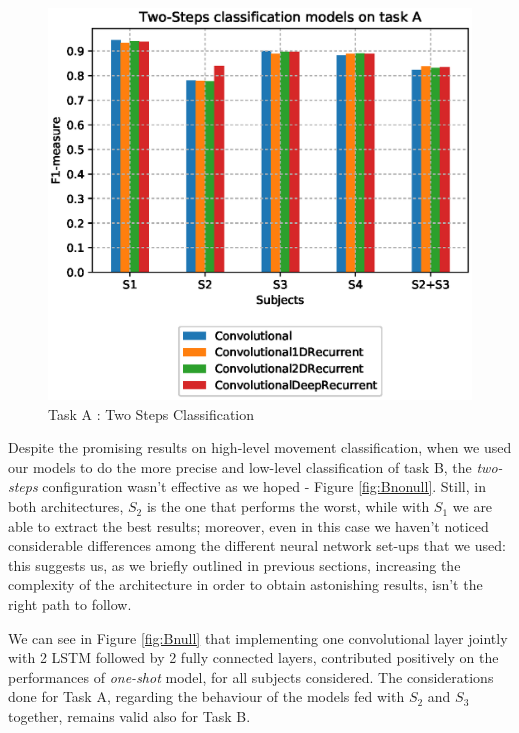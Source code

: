 \begin{figure}[ht]
	\centering
	\includegraphics[scale=.4]{figure/A_models_nonullclass}
	\caption{Task A : Two Steps Classification}
	\label{fig:Anonull}
\end{figure}

Despite the promising results on high-level movement classification, when we used our models to do the more precise and low-level classification of task B, the \textit{two-steps} configuration wasn't effective as we hoped - Figure \ref{fig:Bnonull}. Still, in both architectures, $S_2$ is the one that performs the worst, while with $S_1$ we are able to extract the best results; moreover, even in this case we haven't noticed considerable differences among the different neural network set-ups that we used: this suggests us, as we briefly outlined in previous sections, increasing the complexity of the architecture in order to obtain astonishing results, isn't the right path to follow. 

We can see in Figure \ref{fig:Bnull} that implementing one convolutional layer jointly with 2 LSTM followed by 2 fully connected layers, contributed positively on the performances of \textit{one-shot} model, for all subjects considered. The considerations done for Task A, regarding the behaviour of the models fed with $S_2$ and $S_3$ together, remains valid also for Task B. 


